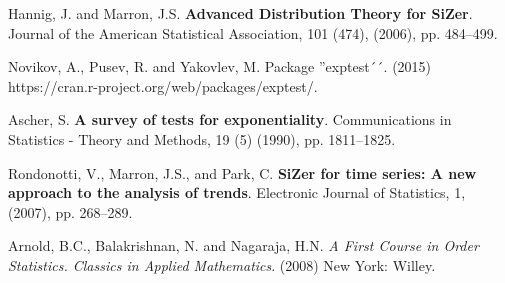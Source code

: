 \documentclass[preprint,12pt]{elsarticle}
\begin{document}
\begin{thebibliography}{}
 Hannig, J. and Marron, J.S. \textbf{Advanced Distribution Theory for SiZer}. Journal of the American Statistical Association, 101 (474), (2006), pp. 484--499. 


 Novikov, A., Pusev, R. and Yakovlev, M. Package ''exptest´´. (2015) https://cran.r-project.org/web/packages/exptest/.


 Ascher, S. \textbf{A survey of tests for exponentiality}. Communications in Statistics - Theory and Methods, 19 (5) (1990), pp. 1811--1825.



 Rondonotti, V., Marron, J.S., and Park, C. \textbf{SiZer for time series: A new approach to the analysis of trends}. Electronic Journal of Statistics, 1, (2007), pp. 268--289.



 Arnold, B.C., Balakrishnan, N. and Nagaraja, H.N. \textit{A First Course in Order Statistics. Classics in Applied Mathematics}. (2008) New York: Willey. 







\end{thebibliography}
\end{document}
